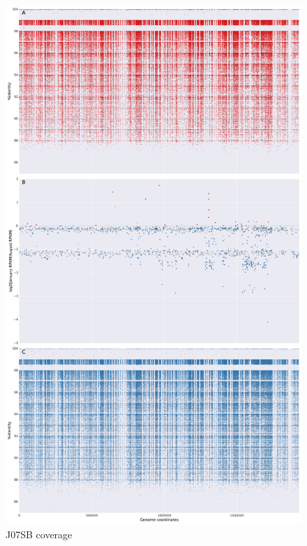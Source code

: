 \begin{figure}[!hbtp]
  \centering
  \includegraphics[width=\textwidth,height=\textheight,keepaspectratio]{Chapter5/Figures/coverage_plots/J07SB_coverage.pdf}
  \caption{J07SB coverage}
  \label{J07SBcoverage}
\end{figure}
